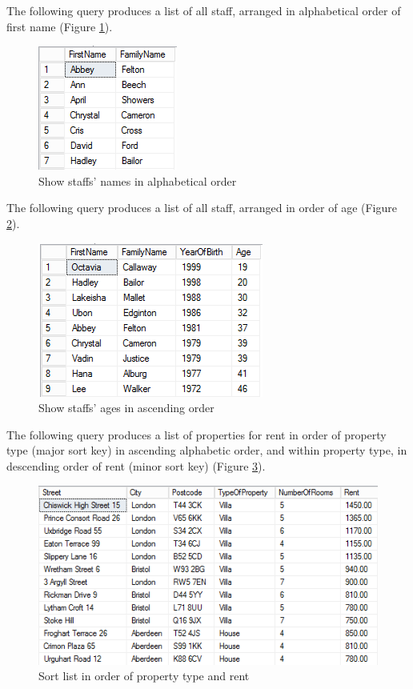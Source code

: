 \documentclass[10pt,a4paper]{article}
\begin{document}
The following query produces a list of all staff, arranged in alphabetical order of first name (Figure \ref{4-OrderFirstName}).

\begin{figure}[hbtp]
	\centering
	\includegraphics[scale=1]{4-OrderFirstName.PNG}
	\caption{Show staffs' names in alphabetical order}
	\label{4-OrderFirstName}
	\end{figure}
The following query produces a list of all staff, arranged in order of age (Figure \ref{4-OrderAge}).

\begin{figure}[hbtp]
	\centering
	\includegraphics[scale=1]{4-OrderAge.PNG}
	\caption{Show staffs' ages in ascending order}
	\label{4-OrderAge}
	\end{figure}
The following query produces a list of properties for rent in order of property type (major sort
key) in ascending alphabetic order, and within property type, in descending order of rent (minor sort key) (Figure \ref{5-OrderProperty}).

\begin{figure}[hbtp]
	\centering
	\includegraphics[scale=1]{5-OrderProperty.PNG}
	\caption{Sort list in order of property type and rent}
	\label{5-OrderProperty}
	\end{figure}
\end{document}

